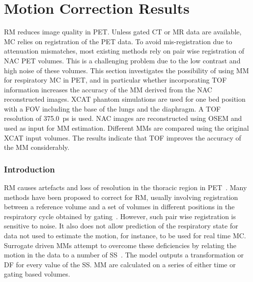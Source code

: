 \chapter{Motion Correction Results} \label{sec:motion_correction_results}
    
    
        \gls{RM} reduces image quality in \gls{PET}. Unless gated \gls{CT} or \gls{MR} data are available, \gls{MC} relies on registration of the \gls{PET} data. To avoid mis-registration due to attenuation mismatches, most existing methods rely on pair wise registration of \gls{NAC} \gls{PET} volumes. This is a challenging problem due to the low contrast and high noise of these volumes. This section investigates the possibility of using \gls{MM} for respiratory \gls{MC} in \gls{PET}, and in particular whether incorporating \gls{TOF} information increases the accuracy of the \gls{MM} derived from the \gls{NAC} reconstructed images. \gls{XCAT} phantom simulations are used for one bed position with a \gls{FOV} including the base of the lungs and the diaphragm. A \gls{TOF} resolution of \SI{375.0}{\pico\second} is used. \gls{NAC} images are reconstructed using \gls{OSEM} and used as input for \gls{MM} estimation. Different \gls{MM}s are compared using the original \gls{XCAT} input volumes. The results indicate that \gls{TOF} improves the accuracy of the \gls{MM} considerably.
        
        \subsection{Introduction} \label{sec:impact_of_tof_on_respiratory_motion_modelling_using_nac_pet_introduction}
        \gls{RM} causes artefacts and loss of resolution in the thoracic region in \gls{PET}~. Many methods have been proposed to correct for \gls{RM}, usually involving registration between a reference volume and a set of volumes in different positions in the respiratory cycle obtained by gating~. However, such pair wise registration is sensitive to noise. It also does not allow prediction of the respiratory state for data not used to estimate the motion, for instance, to be used for real time \gls{MC}. Surrogate driven \gls{MM}s attempt to overcome these deficiencies by relating the motion in the data to a number of \gls{SS}~. The model outputs a transformation or \gls{DF} for every value of the \gls{SS}. \gls{MM} are calculated on a series of either time or gating based volumes.

